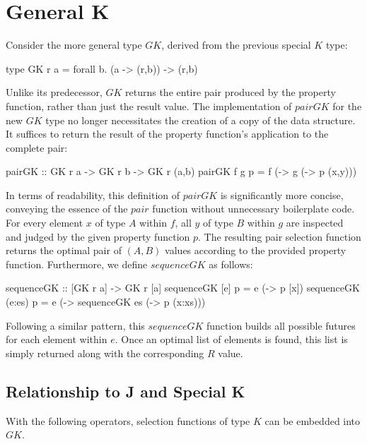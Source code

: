 \documentclass[runningheads]{llncs}
\begin{document}
\section{General K}\label{general-k}

Consider the more general type \(GK\), derived from the previous special
\(K\) type:

\begin{code}
type GK r a = forall b. (a -> (r,b)) -> (r,b)
\end{code}

Unlike its predecessor, \(GK\) returns the entire pair produced by the
property function, rather than just the result value. The implementation
of \(pairGK\) for the new \(GK\) type no longer necessitates the
creation of a copy of the data structure. It suffices to return the
result of the property function's application to the complete pair:

\begin{code}
pairGK :: GK r a -> GK r b -> GK r (a,b)
pairGK f g p = f (\x -> g (\y -> p (x,y)))
\end{code}

In terms of readability, this definition of \(pairGK\) is significantly
more concise, conveying the essence of the \(pair\) function without
unnecessary boilerplate code. For every element \(x\) of type \(A\)
within \(f\), all \(y\) of type \(B\) within \(g\) are inspected and
judged by the given property function \(p\). The resulting pair
selection function returns the optimal pair of \((A,B)\) values
according to the provided property function. Furthermore, we define
\(sequenceGK\) as follows:

\begin{code}
sequenceGK :: [GK r a] -> GK r [a]
sequenceGK [e] p    = e (\x  -> p [x])
sequenceGK (e:es) p = e (\x  -> sequenceGK es 
                        (\xs -> p (x:xs)))
\end{code}

Following a similar pattern, this \(sequenceGK\) function builds all
possible futures for each element within \(e\). Once an optimal list of
elements is found, this list is simply returned along with the
corresponding \(R\) value.

\subsection{Relationship to J and Special
K}\label{relationship-to-j-and-special-k}

With the following operators, selection functions of type \(K\) can be
embedded into \(GK\).
\end{document}
